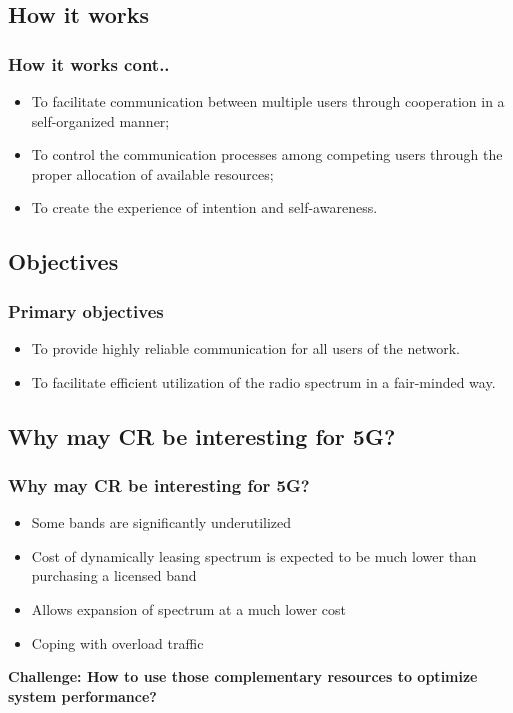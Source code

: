 \documentclass{beamer}
\begin{document}
\subsection{How it works}
\begin{frame}
\frametitle{How it works cont..}
\begin{itemize}
\item To facilitate communication between multiple users through cooperation in a self-organized manner;
\item To control the communication processes among competing users through the proper allocation of available resources;
\item To create the experience of intention and self-awareness.

\end{itemize}
\end{frame}

\subsection{Objectives}
\begin{frame}
\frametitle{Primary objectives}
\begin{itemize}
\item To provide highly reliable communication for all users of the network.
\item To facilitate efficient utilization of the radio spectrum in a fair-minded way.
\end{itemize}
\end{frame}

\subsection{Why may CR be interesting for 5G?}
\begin{frame}
\frametitle{Why may CR be interesting for 5G?}
\begin{itemize}
\item Some bands are significantly underutilized
\item Cost of dynamically leasing spectrum is expected to be much lower than purchasing a licensed band
\item Allows expansion of spectrum at a much lower cost
\item Coping with overload traffic
\end{itemize}
\end{frame}

\begin{frame}
\textbf{Challenge: How to use those complementary resources to optimize system performance?}
\end{frame}
\end{document}
